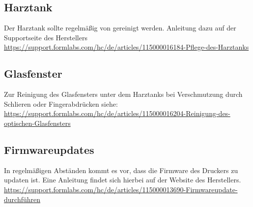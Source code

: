 \documentclass{\basedir/fablab-document}
\begin{document}
\subsection{Harztank}
Der Harztank sollte regelmäßig von gereinigt werden. Anleitung dazu auf der Supportseite des Herstellers\\
\url{https://support.formlabs.com/hc/de/articles/115000016184-Pflege-des-Harztanks}

\subsection{Glasfenster}
Zur Reinigung des Glasfensters unter dem Harztanks bei Verschmutzung durch Schlieren oder Fingerabdrücken siehe:\\ \url{https://support.formlabs.com/hc/de/articles/115000016204-Reinigung-des-optischen-Glasfensters}

\subsection{Firmwareupdates}

In regelmäßigen Abständen kommt es vor, dass die Firmware des Druckers zu updaten ist. Eine Anleitung findet sich hierbei auf der Website des Herstellers.\\
\url{https://support.formlabs.com/hc/de/articles/115000013690-Firmwareupdate-durchführen}

\end{document}
